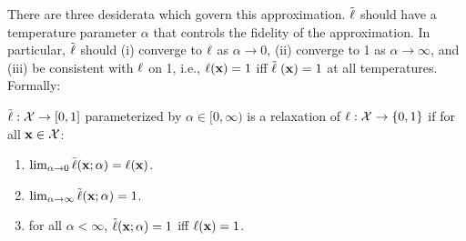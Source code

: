 There are three desiderata which govern this approximation.
$\mathrel{\tilde{\operatorname{\ell}}}$ should have a temperature parameter $\alpha$ that controls the fidelity of the approximation. In particular, $\mathrel{\tilde{\operatorname{\ell}}}$ should (i) converge to $\operatorname{\ell}$ as $\alpha \to 0$, (ii) converge to 1 as $\alpha \to \infty$, and (iii) be consistent with $\operatorname{\ell}$ on 1, i.e., $\operatorname{\ell}(\mathbf{x}) = 1$ iff $\mathrel{\tilde{\operatorname{\ell}}}(\mathbf{x}) = 1$ at all temperatures.  
Formally:



\begin{definition}
$\tilde{\operatorname{\ell}} : {\mathcal{X}} \to [0, 1]$ parameterized by $\alpha \in [0, \infty)$ is a relaxation of $\operatorname{\ell}: {\mathcal{X}} \to \{0, 1\}$ if for all $\mathbf{x} \in {\mathcal{X}}$:
\begin{enumerate}[label=(\roman*)]
	\label{def:temp}
	\item $\lim_{\alpha \to 0}\tilde{\operatorname{\ell}}(\mathbf{x}; \alpha) = \operatorname{\ell}(\mathbf{x})$.
	\item $\lim_{\alpha \to \infty}\tilde{\operatorname{\ell}}(\mathbf{x}; \alpha) = 1$.
  \item for all $\alpha < \infty$, $\tilde{\operatorname{\ell}}(\mathbf{x}; \alpha) = 1$ iff $\operatorname{\ell}(\mathbf{x}) = 1$.
\end{enumerate}
\end{definition}


